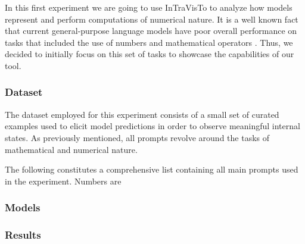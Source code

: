 In this first experiment we are going to use InTraVisTo to analyze how models represent and perform computations of numerical nature.
It is a well known fact that current general-purpose language models have  poor overall performance on tasks that included the use of numbers and mathematical operators .
Thus, we decided to initially focus on this set of tasks to showcase the  capabilities of our  tool.

\subsubsection{Dataset}

The dataset employed for this experiment consists of a small set of curated examples used to elicit model predictions in order to observe meaningful internal states.
As previously mentioned, all prompts revolve around the  tasks of mathematical and numerical nature.

The following constitutes a comprehensive list containing all main prompts used in the experiment.
Numbers are 



\subsubsection{Models}

\subsubsection{Results}

